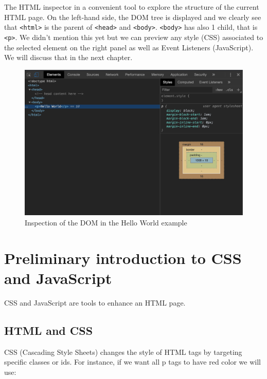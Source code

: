 \documentclass[]{book}
\begin{document}
The HTML inspector in a convenient tool to explore the structure of the current HTML page. On the left-hand side, the DOM tree is displayed and we clearly see that \texttt{\textless{}html\textgreater{}} is the parent of \texttt{\textless{}head\textgreater{}} and \texttt{\textless{}body\textgreater{}}. \texttt{\textless{}body\textgreater{}} has also 1 child, that is \texttt{\textless{}p\textgreater{}}. We didn't mention this yet but we can preview any style (CSS) associated to the selected element on the right panel as well as Event Listeners (JavaScript). We will discuss that in the next chapter.

\begin{figure}
\includegraphics[width=21.5in]{images/survival-kit/dom} \caption{Inspection of the DOM in the Hello World example}\label{fig:html-dom}
\end{figure}

\hypertarget{preliminary-introduction-to-css-and-javascript}{%
\section{Preliminary introduction to CSS and JavaScript}\label{preliminary-introduction-to-css-and-javascript}}

CSS and JavaScript are tools to enhance an HTML page.

\hypertarget{html-and-css}{%
\subsection{HTML and CSS}\label{html-and-css}}

CSS (Cascading Style Sheets) changes the style of HTML tags by targeting specific classes or ids. For instance, if we want all p tags to have red color we will use:
\end{document}
